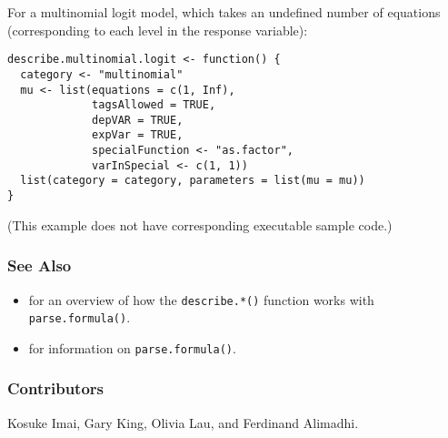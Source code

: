 For a multinomial logit model, which takes an undefined number of
equations (corresponding to each level in the response variable):  
\begin{verbatim}
describe.multinomial.logit <- function() { 
  category <- "multinomial"
  mu <- list(equations = c(1, Inf), 
             tagsAllowed = TRUE, 
             depVAR = TRUE, 
             expVar = TRUE, 
             specialFunction <- "as.factor", 
             varInSpecial <- c(1, 1))
  list(category = category, parameters = list(mu = mu))
}
\end{verbatim}
(This example does not have corresponding executable sample code.)

\subsubsection{See Also}
\begin{itemize}
\item {} for an overview of how the {\tt describe.*()}
function works with {\tt parse.formula()}.  
\item {} for information on {\tt parse.formula()}.
\end{itemize}

\subsubsection{Contributors}

Kosuke Imai, Gary King, Olivia Lau, and Ferdinand Alimadhi.

